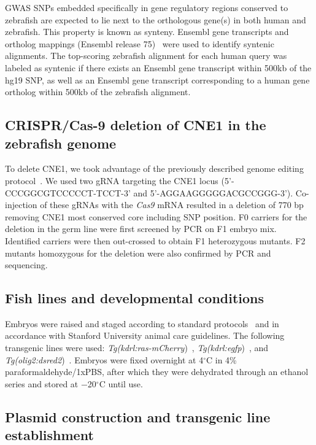 GWAS SNPs embedded specifically in gene regulatory regions conserved to
zebrafish are expected to lie next to the orthologous gene(s) in both
human and zebrafish. This property is known as synteny. Ensembl gene
transcripts and ortholog mappings (Ensembl release 75)~\citep{Flicek:2014cy} were used to
identify syntenic alignments. The top-scoring zebrafish alignment for
each human query was labeled as syntenic if there exists an Ensembl gene
transcript within 500kb of the hg19 SNP, as well as an Ensembl gene
transcript corresponding to a human gene ortholog within 500kb of the
zebrafish alignment.

\subsection{CRISPR/Cas-9 deletion of CNE1 in the zebrafish genome}

To delete CNE1, we took advantage of the previously described genome
editing protocol~\citep{Varshney:2015jc}.
We used two gRNA targeting the CNE1 locus (5'-CCCGGCGTCCCCCT-TCCT-3' and
5'-AGGAAGGGGGACGCCGGG-3'). Co-injection of these gRNAs with the
\emph{Cas9} mRNA resulted in a deletion of 770 bp removing CNE1 most
conserved core including SNP position. F0 carriers for the deletion in
the germ line were first screened by PCR on F1 embryo mix. Identified
carriers were then out-crossed to obtain F1 heterozygous mutants. F2
mutants homozygous for the deletion were also confirmed by PCR and
sequencing.

\subsection{Fish lines and developmental conditions}

Embryos were raised and staged according to standard protocols~\citep{Kimmel:1995kn} and in accordance
with Stanford University animal care guidelines. The following
transgenic lines were used: \emph{Tg(kdrl:ras-mCherry})~\citep{Kimmel:1995kn}, \emph{Tg(kdrl:egfp})~\citep{Choi:2007dn}, and
\emph{Tg(olig2:dsred2})~\citep{Kucenas:2008ec}. Embryos were fixed overnight at 4$^\circ$C in 4\%
paraformaldehyde/1xPBS, after which they were dehydrated through an
ethanol series and stored at −20$^\circ$C until use.

\subsection{Plasmid construction and transgenic line establishment}

